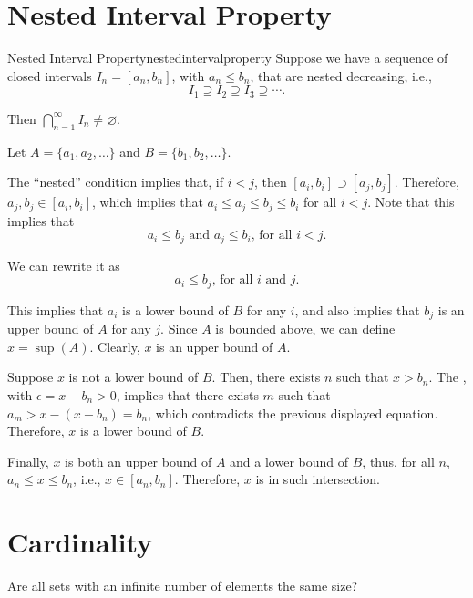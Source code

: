 
\section{Nested Interval Property}

\begin{thm}{Nested Interval Property}{nestedintervalproperty}
	Suppose we have a sequence of closed intervals \(I_n = [a_n, b_n]\), with \(a_n \leq b_n\), that are nested decreasing, i.e.,  \[
		I_1 \supseteq I_2 \supseteq I_3 \supseteq \cdots.
	\]

	Then \(\bigcap_{n=1}^\infty I_n \neq \varnothing\).
\end{thm}

\begin{dem}{}{}
	Let \(A = \{a_1, a_2, \dots\}\) and \(B = \{b_1, b_2, \dots\}\). 

	The ``nested'' condition implies that, if \(i < j\), then \([a_i, b_i] \supset [a_j, b_j]\). Therefore,  \(a_j, b_j \in [a_i, b_i]\), which implies that  \(a_i \leq a_j \leq b_j \leq b_i\) for all \(i < j\). Note that this implies that  \[
		a_i \leq b_j \text{ and } a_j \leq b_i \text{, for all }i < j.
	\]

	We can rewrite it as \[
		a_i \leq b_j\text{, for all }i\text{ and }j.
	\]

	This implies that \(a_i\) is a lower bound of \(B\) for any \(i\), and also implies that \(b_j\) is an upper bound of \(A\) for any \(j\). Since \(A\) is bounded above, we can define \(x = \sup(A)\). Clearly, \(x\) is an upper bound of \(A\).

	Suppose \(x\) is not a lower bound of \(B\). Then, there exists \(n\) such that \(x > b_n\). The , with \(\epsilon = x - b_n > 0\), implies that there exists \(m\) such that \(a_m > x - (x - b_n) = b_n\), which contradicts the previous displayed equation. Therefore, \(x\) is a lower bound of \(B\).

	Finally, \(x\) is both an upper bound of \(A\) and a lower bound of \(B\), thus, for all \(n\), \(a_n \leq x \leq b_n\), i.e.,  \(x \in [a_n, b_n]\). Therefore, \(x\) is in such intersection.
\end{dem}

\section{Cardinality}

\begin{que}{}{}
	Are all sets with an infinite number of elements the same size?
\end{que}

